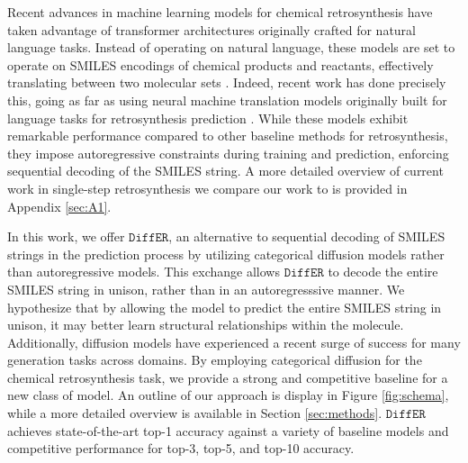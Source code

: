\documentclass{article}
\newcommand{\ours}{$\texttt{DiffER}$\xspace}
\begin{document}
Recent advances in machine learning models for chemical retrosynthesis have taken advantage of transformer architectures originally crafted for natural language tasks. Instead of operating on natural language, these models are set to operate on SMILES \cite{weininger1988smiles} encodings of chemical products and reactants, effectively translating between two molecular sets \cite{liu2017retrosynthetic}. Indeed, recent work has done precisely this, going as far as using neural machine translation models originally built for language tasks for retrosynthesis prediction \citep{zhong2022root, irwin2022chemformer}. While these models exhibit remarkable performance compared to other baseline methods for retrosynthesis, they impose autoregressive constraints during training and prediction, enforcing sequential decoding of the SMILES string. A more detailed overview of current work in single-step retrosynthesis we compare our work to is provided in Appendix \ref{sec:A1}.

In this work, we offer \ours, an alternative to sequential decoding of SMILES strings in the prediction process by utilizing categorical diffusion models rather than autoregressive models. This exchange allows \ours to decode the entire SMILES string in unison, rather than in an autoregresssive manner. We hypothesize that by allowing the model to predict the entire SMILES string in unison, it may better learn structural relationships within the molecule. Additionally, diffusion models have experienced a recent surge of success for many generation tasks across domains. By employing categorical diffusion for the chemical retrosynthesis task, we provide a strong and competitive baseline for a new class of model. An outline of our approach is display in Figure \ref{fig:schema}, while a more detailed overview is available in Section \ref{sec:methods}. \ours achieves state-of-the-art top-1 accuracy against a variety of baseline models and competitive performance for top-3, top-5, and top-10 accuracy.
\end{document}
